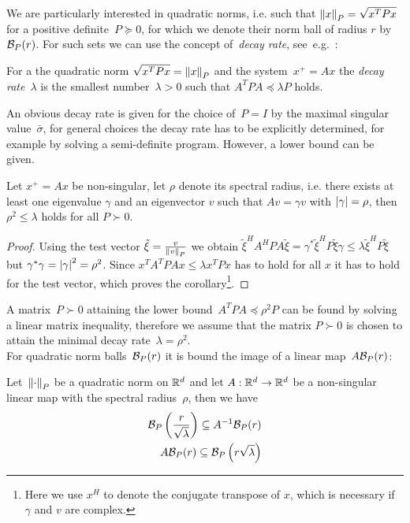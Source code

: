 %
\noindent We are particularly interested in quadratic norms, i.e. such that $\left\|x\right\|_P = \sqrt{x^TPx}$ for a positive definite~$P\succeq0$, for which we denote their norm ball of radius $r$ by~$\mathcal B_P(r)$.
%
For such sets we can use the concept of~\emph{decay rate}, see~e.g.~\cite{Boyd:1994}:
%
\begin{defi}\label{def:decay:rate}
For a the quadratic norm $\sqrt{x^TPx}=\left\|x\right\|_P$ and the system~$x^+ = Ax$ the \emph{decay rate}~$\lambda$ is the smallest number~$\lambda>0$ such that $A^TPA\preceq\lambda P$ holds.
\end{defi}
%
\noindent An obvious decay rate is given for the choice of~$P=I$ by the maximal singular value~$\bar\sigma$, for general choices the decay rate has to be explicitly determined, for example by solving a semi-definite program.
%
However, a lower bound can be given.
%
\begin{cor}\label{thm:decay:rate}
Let $x^+=Ax$ be non-singular, let $\rho$ denote its spectral radius, i.e. there exists at least one eigenvalue $\gamma$ and an eigenvector $v$ such that $A v = \gamma v$ with $\left|\gamma\right|=\rho$, then $\rho^2\leq\lambda$ holds for all $P\succ0$.
\end{cor}
%
\begin{proof}
Using the test vector $\tilde\xi=\frac{v}{\left\|v\right\|_P}$ we obtain $\tilde\xi^H A^H P A\tilde \xi = \gamma^\ast\tilde\xi^H P\tilde \xi\gamma\leq\lambda\tilde\xi^H P\tilde\xi$ but $\gamma^\ast\gamma = \left|\gamma\right|^2 = \rho^2$.
%
Since $x^T A^T P A x\leq \lambda x^T Px$ has to hold for all $x$ it has to hold for the test vector, which proves the corollary\footnote{Here we use $x^H$ to denote the conjugate transpose of $x$, which is necessary if $\gamma$ and $v$ are complex.}.
\end{proof}
%
\noindent A matrix~$P\succ0$ attaining the lower bound~$A^TPA\preceq\rho^2P$ can be found by solving a linear matrix inequality, therefore we assume that the matrix $P\succ0$ is chosen to attain the minimal decay rate~$\lambda=\rho^2$.
%
\\[1em]
%
For quadratic norm balls~$\mathcal B_P(r)$ it is bound the image of a linear map~$A\mathcal B_P(r)$:
%
\begin{cor}\label{thm:containement:image:and:pre:image}
Let~$\left\|\cdot\right\|_P$ be a quadratic norm on $\mathbb R^d$ and let $A:\mathbb R^d\rightarrow\mathbb R^d$ be a non-singular linear map with the spectral radius~$\rho$, then we have
%
\begin{align}
\mathcal B_P\left(\frac{r}{\sqrt\lambda}\right)\subseteq A^{-1}\mathcal B_P(r)\\
A \mathcal B_P(r) \subseteq\mathcal B_P\left({r}{\sqrt\lambda}\right)
\end{align}
\end{cor}
